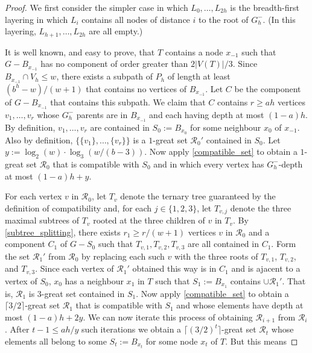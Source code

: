 \documentclass{patmorin}
\begin{document}
\begin{proof}
  We first consider the simpler case in which $L_0,\ldots,L_{2h}$ is the breadth-first layering in which $L_i$ contains all nodes of distance $i$ to the root of $G_h^-$.  (In this layering, $L_{h+1},\ldots,L_{2h}$ are all empty.)

  It is well known, and easy to prove, that $T$ contains a node $x_{-1}$ such that $G-B_{x_{-1}}$ has no component of order greater than $2|V(T)|/3$.
  Since $B_{x_{-1}}\cap V_h \le w$, there exists a subpath of $P_h$ of length at least $(b^h-w)/(w+1)$ that contains no vertices of $B_{x_{-1}}$.  Let $C$ be the component of $G-B_{x_{-1}}$ that contains this subpath.  We claim that $C$ contains $r\ge ah$ vertices $v_1,\ldots,v_r$ whose $G_h^-$ parents are in $B_{x_{-1}}$ and each having depth at most $(1-a)h$.  By definition, $v_1,\ldots,v_r$ are contained in $S_0:=B_{x_0}$ for some neighbour $x_0$ of $x_{-1}$.  Also by definition, $\{\{v_1\},\ldots,\{v_r\}\}$ is a $1$-great set $\mathcal{R}_0'$ contained in $S_0$.  Let $y:=\log_2(w)\cdot\log_3(w/(b-3))$.  Now apply \cref{compatible_set} to obtain a $1$-great set $\mathcal{R}_0$ that is compatible with $S_0$ and in which every vertex has $G_h^-$-depth at most $(1-a)h+y$.  

  For each vertex $v$ in $\mathcal{R}_0$, let $T_v$ denote the ternary tree guaranteed by the definition of compatibility and, for each $j\in\{1,2,3\}$, let $T_{v,j}$ denote the three maximal subtrees of $T_v$ rooted at the three children of $v$ in $T_v$.  By \cref{subtree_splitting}, there exists $r_1\ge r/(w+1)$ vertices $v$ in $\mathcal{R}_0$ and a component $C_1$ of $G-S_0$ such that $T_{v,1},T_{v,2},T_{v,3}$ are all contained in $C_1$.  Form the set $\mathcal{R}_1'$ from $\mathcal{R}_0$ by replacing each such $v$ with the three roots of $T_{v,1}$, $T_{v,2}$, and $T_{v,3}$.  Since each vertex of $\mathcal{R}_1'$ obtained this way is in $C_1$ and is ajacent to a vertex of $S_0$, $x_0$ has a neighbour $x_1$ in $T$ such that $S_1:=B_{x_1}$ contains $\cup\mathcal{R}_1'$.  That is, $\mathcal{R}_1$ is $3$-great set contained in $S_1$.  Now apply \cref{compatible_set} to obtain a $\lceil 3/2\rceil$-great set $\mathcal{R}_1$ that is compatible with $S_1$ and whose elements have depth at most $(1-a)h+2y$.  We can now iterate this process of obtaining $\mathcal{R}_{i+1}$ from $\mathcal{R}_i$.  After $t-1\le ah/y$ such iterations we obtain a $\lceil(3/2)^t\rceil$-great set $\mathcal{R}_t$ whose elements all belong to some $S_t:=B_{x_{t}}$ for some node $x_t$ of $T$.  But this means  
\end{proof}
\end{document}
